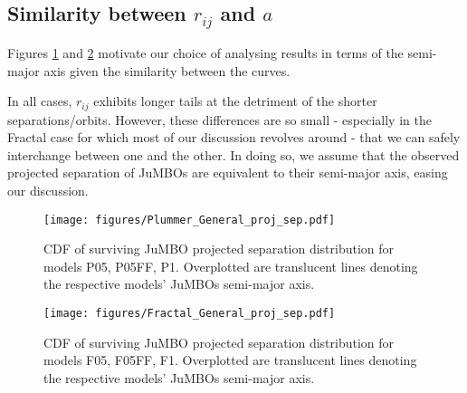 \documentclass[aa]{aa}
\begin{document}
\begin{appendix}
    \section{Similarity between $r_{ij}$ and $a$}
    Figures \ref{Fig:Plummer_rsep} and \ref{Fig:Fractal_rsep} motivate our choice of analysing results in terms of the semi-major axis given the similarity between the curves. 
    
    In all cases, $r_{ij}$ exhibits longer tails at the detriment of the shorter separations/orbits. However, these differences are so small - especially in the Fractal case for which most of our discussion revolves around - that we can safely interchange between one and the other. In doing so, we assume that the observed projected separation of JuMBOs are equivalent to their semi-major axis, easing our discussion.
    
    \begin{figure}
    \centering
        \texttt{[image: figures/Plummer\_General\_proj\_sep.pdf]}
        \caption{CDF of surviving JuMBO projected separation distribution for models P05, P05FF, P1. Overplotted are translucent lines denoting the respective models' JuMBOs semi-major axis.}
         \label{Fig:Plummer_rsep}
   \end{figure}
   \begin{figure}
    \centering
        \texttt{[image: figures/Fractal\_General\_proj\_sep.pdf]}
        \caption{CDF of surviving JuMBO projected separation distribution for models F05, F05FF, F1. Overplotted are translucent lines denoting the respective models' JuMBOs semi-major axis.}
         \label{Fig:Fractal_rsep}
   \end{figure}
\end{appendix}
\end{document}
